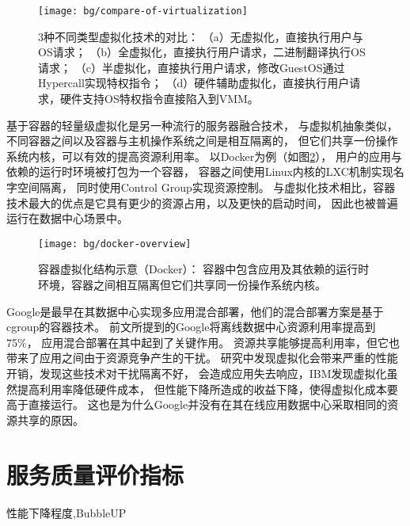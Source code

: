 \begin{figure}[t]
  \centering
  \texttt{[image: bg/compare-of-virtualization]}
  \caption[3种不同类型虚拟化技术的对比]{3种不同类型虚拟化技术的对比：
    （a）无虚拟化，直接执行用户与OS请求；
    （b）全虚拟化，直接执行用户请求，二进制翻译执行OS请求；
    （c）半虚拟化，直接执行用户请求，修改GuestOS通过Hypercall实现特权指令；
    （d）硬件辅助虚拟化，直接执行用户请求，硬件支持OS特权指令直接陷入到VMM。}
  \label{fig:compare-of-virt}
\end{figure}

基于容器的轻量级虚拟化是另一种流行的服务器融合技术，
与虚拟机抽象类似，不同容器之间以及容器与主机操作系统之间是相互隔离的，
但它们共享一份操作系统内核，可以有效的提高资源利用率。
以Docker为例（如图\ref{fig:docker-overview}），
用户的应用与依赖的运行时环境被打包为一个容器，
容器之间使用Linux内核的LXC\cite{lxc}机制实现名字空间隔离，
同时使用Control Group\cite{cgroup}实现资源控制。
与虚拟化技术相比，容器技术最大的优点是它具有更少的资源占用，以及更快的启动时间，
因此也被普遍运行在数据中心场景中。

\begin{figure}[htb]
  \centering
  \begin{minipage}{0.75\textwidth}
    \texttt{[image: bg/docker-overview]}
    \caption[容器虚拟化结构示意（Docker）]{容器虚拟化结构示意（Docker）：
      容器中包含应用及其依赖的运行时环境，容器之间相互隔离但它们共享同一份操作系统内核。}
    \label{fig:docker-overview}
  \end{minipage}
\end{figure}


Google是最早在其数据中心实现多应用混合部署，他们的混合部署方案是基于cgroup的容器技术。
前文所提到的Google将离线数据中心资源利用率提高到75\%，
应用混合部署在其中起到了关键作用。
资源共享能够提高利用率，但它也带来了应用之间由于资源竞争产生的干扰。
研究\cite{}中发现虚拟化会带来严重的性能开销，\cite{}发现这些技术对干扰隔离不好，
会造成应用失去响应，IBM发现虚拟化虽然提高利用率降低硬件成本，
但性能下降所造成的收益下降，使得虚拟化成本要高于直接运行\cite{}。
这也是为什么Google并没有在其在线应用数据中心采取相同的资源共享的原因。


\section{服务质量评价指标}

性能下降程度,BubbleUP


